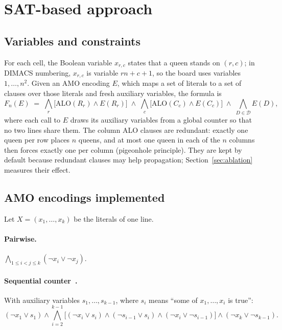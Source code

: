 \documentclass[a4paper,fleqn]{cas-sc}
\newcommand{\ALO}{\mathrm{ALO}}
\begin{document}
\section{SAT-based approach}\label{sec:method}

\subsection{Variables and constraints}

For each cell, the Boolean variable $x_{r,c}$ states that a queen stands on $(r,c)$; in DIMACS numbering, $x_{r,c}$ is variable $rn+c+1$, so the board uses variables $1,\dots,n^2$. Given an AMO encoding $E$, which maps a set of literals to a set of clauses over those literals and fresh auxiliary variables, the formula is
\begin{equation}\label{eq:cnf}
F_n(E) \;=\; \bigwedge_{r} \big[\ALO(R_r)\wedge E(R_r)\big] \;\wedge\; \bigwedge_{c} \big[\ALO(C_c)\wedge E(C_c)\big] \;\wedge\; \bigwedge_{D\in\mathcal{D}} E(D),
\end{equation}
where each call to $E$ draws its auxiliary variables from a global counter so that no two lines share them. The column ALO clauses are redundant: exactly one queen per row places $n$ queens, and at most one queen in each of the $n$ columns then forces exactly one per column (pigeonhole principle). They are kept by default because redundant clauses may help propagation; Section~\ref{sec:ablation} measures their effect.

\subsection{AMO encodings implemented}\label{sec:encodings}

Let $X=(x_1,\dots,x_k)$ be the literals of one line.

\paragraph{Pairwise.} $\bigwedge_{1\le i<j\le k}(\neg x_i\vee\neg x_j)$.

\paragraph{Sequential counter~\citep{sinz2005towards}.} With auxiliary variables $s_1,\dots,s_{k-1}$, where $s_i$ means ``some of $x_1,\dots,x_i$ is true'':
\begin{equation}
(\neg x_1\vee s_1)\wedge\bigwedge_{i=2}^{k-1}\big[(\neg x_i\vee s_i)\wedge(\neg s_{i-1}\vee s_i)\wedge(\neg x_i\vee\neg s_{i-1})\big]\wedge(\neg x_k\vee\neg s_{k-1}).
\end{equation}
\end{document}
